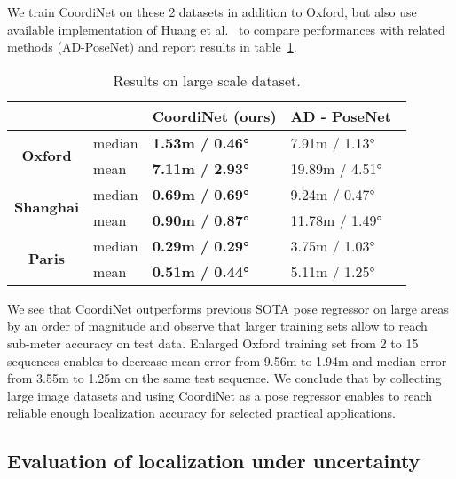 \documentclass[10pt,twocolumn,letterpaper]{article}
\begin{document}
We train CoordiNet on these 2 datasets in addition to Oxford, but also use available implementation of Huang et al.~\cite{RVL} to compare performances with related methods (AD-PoseNet) and report results in table~\ref{tab:large_scale_results}.

\begin{table}[ht]
\footnotesize
\centering
\caption{Results on large scale dataset\label{tab:large_scale_results}.}
\begin{tabular}{|c|l|l|l|}
\hline
\multicolumn{2}{|c|}{\textbf{}}            & \textbf{CoordiNet (ours)} & \textbf{AD - PoseNet~\cite{RVL}} \\ \hline
\multirow{2}{*}{\textbf{Oxford}}  & median & \textbf{1.53m / 0.46°}  & 7.91m / 1.13°          \\ \cline{2-4} 
                                  & mean   & \textbf{7.11m / 2.93°}  & 19.89m / 4.51°                      \\ \hline
\multirow{2}{*}{\textbf{Shanghai}} & median & \textbf{0.69m / 0.69°}    & 9.24m / 0.47°         \\ \cline{2-4} 
                                  & mean   & \textbf{0.90m / 0.87°}    & 11.78m / 1.49°        \\ \hline
\multirow{2}{*}{\textbf{Paris}} & median & \textbf{0.29m / 0.29°}    & 3.75m / 1.03°         \\ \cline{2-4} 
                                  & mean   & \textbf{0.51m / 0.44°}    & 5.11m / 1.25°         \\ \hline
\end{tabular}
\end{table}

We see that CoordiNet outperforms previous SOTA pose regressor on large areas by an order of magnitude and observe that larger training sets allow to reach sub-meter accuracy on test data. Enlarged Oxford training set from 2 to 15 sequences enables to decrease mean error from 9.56m to 1.94m and median error from 3.55m to 1.25m on the same test sequence. We conclude that by collecting large image datasets and using CoordiNet as a pose regressor enables to reach reliable enough localization accuracy for selected practical applications. 

\subsection{Evaluation of localization under uncertainty}
\label{loc_uncertainty_exp}
\end{document}
